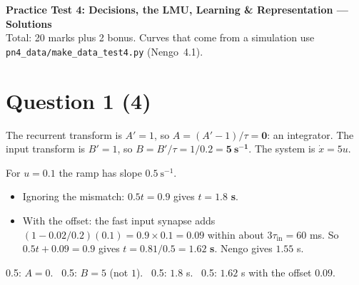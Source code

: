 \documentclass[11pt,letterpaper]{article}
\newcommand{\tin}{\tau_{\mathrm{in}}}
\newcommand{\ans}[1]{\par\vspace{4pt}{\bfseries #1}\quad}
\begin{document}
\begin{center}
{\Large\bfseries Practice Test 4: Decisions, the LMU, Learning \& Representation --- Solutions}\\[2pt]
Total: 20 marks plus 2 bonus. Curves that come from a simulation use \texttt{pn4\_data/make\_data\_test4.py} (Nengo~4.1).
\end{center}

\section*{Question 1 \hfill (4)}

\ans{(a) [2]}
The recurrent transform is $A' = 1$, so $A = (A' - 1)/\tau = \mathbf{0}$: an integrator. The input transform is $B' = 1$, so $B = B'/\tau = 1/0.2 = \mathbf{5\ s^{-1}}$. The system is $\dot x = 5u$.

For $u = 0.1$ the ramp has slope $0.5\ \mathrm{s^{-1}}$.
\begin{itemize}[leftmargin=1.2em]
\item Ignoring the mismatch: $0.5t = 0.9$ gives $t = \mathbf{1.8}$ \textbf{s}.
\item With the offset: the fast input synapse adds $(1 - 0.02/0.2)(0.1) = 0.9 \times 0.1 = 0.09$ within about $3\tin = 60$ ms. So $0.5t + 0.09 = 0.9$ gives $t = 0.81/0.5 = \mathbf{1.62}$ \textbf{s}. Nengo gives $1.55$ s.
\end{itemize}
\begin{marking}
0.5: $A = 0$. \ 0.5: $B = 5$ (not $1$). \ 0.5: $1.8$ s. \ 0.5: $1.62$ s with the offset $0.09$.
\end{marking}
\end{document}
